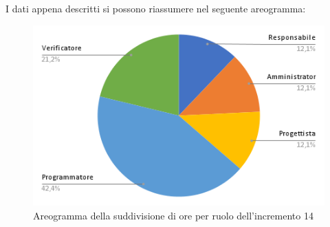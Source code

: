 \pagebreak
I dati appena descritti si possono riassumere nel seguente areogramma:
\begin{figure}[!h]
    \vspace{5px}
    \includegraphics[scale=0.5]{../../../Images/Diagrammi/Diagramma a torta/areogrammaIncremento14.png}
    \centering
    \caption{Areogramma della suddivisione di ore per ruolo dell'incremento 14}
\end{figure}

